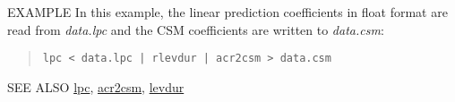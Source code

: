 \begin{options}
\end{options}

\begin{qsection}{EXAMPLE}
In this example, the linear prediction coefficients in float format
are read from {\em data.lpc} and the CSM coefficients are written to
{\em data.csm}:
\begin{quote}
 \verb!lpc < data.lpc | rlevdur | acr2csm > data.csm!
\end{quote}
\end{qsection}

\begin{qsection}{SEE ALSO}
\hyperlink{lpc}{lpc},
\hyperlink{acr2csm}{acr2csm},
\hyperlink{levdur}{levdur}
\end{qsection}
